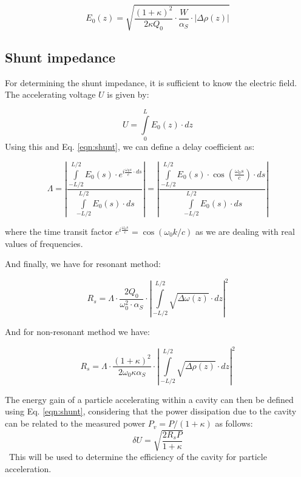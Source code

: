 \documentclass[a4paper]{report}
\numberwithin{equation}{section}
\begin{document}
\begin{equation} \label{eqn:E0_nonres}
		E_{0}(z) = \sqrt{\frac{(1 + \kappa)^2}{2 \kappa Q_{0}}\cdot \frac{W}{\alpha_{S}}\cdot \left| \Delta \rho(z) \right| }
\end{equation}

\subsection{Shunt impedance}
For determining the shunt impedance, it is sufficient to know the electric field. The accelerating voltage $U$ is given by: 

\[ 
		U = \int\limits_{0}^{L} E_{0}(z) \cdot dz
\]
Using this and Eq. \ref{eqn:shunt}, we can define a delay coefficient as: 

\begin{equation}
		\Lambda = \left| \frac{\int\limits_{-L/2}^{L/2} E_{0}(s) \cdot e^{i \frac{\omega_{0}s}{c}\cdot ds}}{\int\limits_{-L/2}^{L/2} E_{0}(s) \cdot ds} \right| = 
		\left| \frac{\int\limits_{-L/2}^{L/2} E_{0}(s) \cdot \cos\left(\frac{\omega_{0}s}{c} \right)\cdot ds }{\int\limits_{-L/2}^{L/2} E_{0}(s) \cdot ds} \right| 
\end{equation}

where the time transit factor $e^{i \frac{\omega_{0}s}{c}} = \cos(\omega_0 k / c)$ as we are dealing with real values of frequencies. \par 
And finally, we have for resonant method:

\begin{equation} \label{eqn:Rs_res}
		R_{s} = \Lambda \cdot \frac{2Q_{0}}{\omega_{0}^2 \cdot \alpha_{S}} \cdot \left| \int\limits_{-L/2}^{L/2} \sqrt{\Delta \omega (z)} \cdot dz \right|^2
\end{equation}

And for non-resonant method we have: 

\begin{equation} \label{eqn:Rs_nonres}
		R_{s} = \Lambda \cdot \frac{(1 + \kappa)^2}{2 \omega_{0} \kappa \alpha_{S}} \cdot \left| \int\limits_{-L/2}^{L/2} \sqrt{\Delta \rho (z)} \cdot dz \right|^2
\end{equation}

The energy gain of a particle accelerating within a cavity can then be defined using Eq. \ref{eqn:shunt}, considering that the power dissipation due to the cavity 
can be related to the measured power $P_v = P / (1 + \kappa)$ as follows:
\begin{equation} \label{eqn:energy_gain}
	\delta U = \sqrt{\frac{2 R_s P}{1 + \kappa}}
\end{equation}\
This will be used to determine the efficiency of the cavity for particle acceleration.
\end{document}
